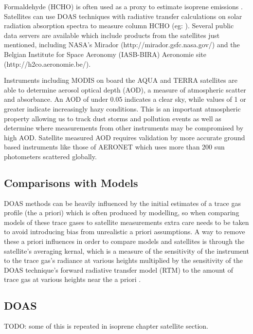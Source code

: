     
    Formaldehyde (HCHO) is often used as a proxy to estimate isoprene emissions \citep{Marais_2012,bauwens2013satellite}.
    Satellites can use DOAS techniques with radiative transfer calculations on solar radiation absorption spectra to measure column HCHO (eg: \citet{Leue_2001}).
    Several public data servers are available which include products from the satellites just mentioned, including NASA's Mirador (http://mirador.gsfc.nasa.gov/) and the Belgian Institute for Space Aeronomy (IASB-BIRA) Aeronomie site (http://h2co.aeronomie.be/).

    Instruments including MODIS on board the AQUA and TERRA satellites are able to determine aerosol optical depth (AOD), a measure of atmospheric scatter and absorbance. 
    An AOD of under 0.05 indicates a clear sky, while values of 1 or greater indicate increasingly hazy conditions.
    This is an important atmospheric property allowing us to track dust storms and pollution events as well as determine where measurements from other instruments may be compromised by high AOD.
    Satellite measured AOD requires validation by more accurate ground based instruments like those of AERONET which uses more than 200 sun photometers scattered globally. 
  
  \subsection{Comparisons with Models}
  
    DOAS methods can be heavily influenced by the initial estimates of a trace gas profile (the a priori) which is often produced by modelling, so when comparing models of these trace gases to satellite measurements extra care needs to be taken to avoid introducing bias from unrealistic a priori assumptions.
    A way to remove these a priori influences in order to compare models and satellites is through the satellite's averaging kernal, which is a measure of the sensitivity of the instrument to the trace gas's radiance at various heights multiplied by the sensitivity of the DOAS technique's forward radiative transfer model (RTM) to the amount of trace gas at various heights near the a priori \citep{Eskes_2003}.
  
  \subsection{DOAS}
    TODO: some of this is repeated in isoprene chapter satellite section.
    
